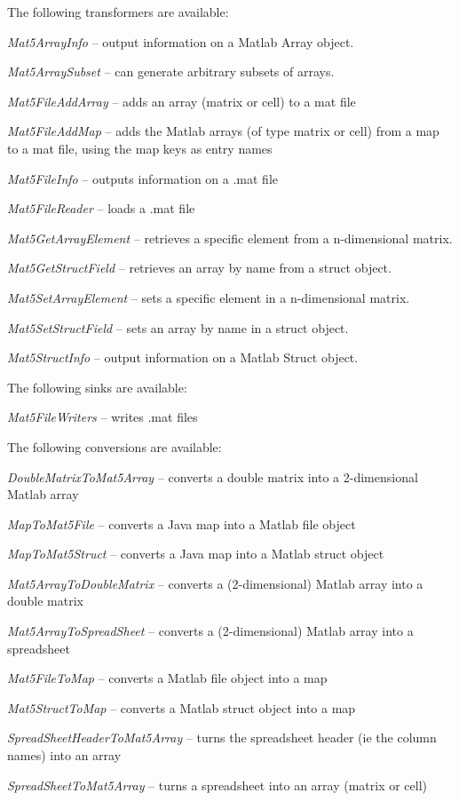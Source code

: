 \documentclass[a4paper]{book}
\begin{document}
The following transformers are available:
\begin{tight_itemize}
  \item \textit{Mat5ArrayInfo} -- output information on a Matlab Array object.
  \item \textit{Mat5ArraySubset} -- can generate arbitrary subsets of arrays.
  \item \textit{Mat5FileAddArray} -- adds an array (matrix or cell) to a mat file
  \item \textit{Mat5FileAddMap} -- adds the Matlab arrays (of type matrix or cell) from a map to a mat file, using the map keys as entry names
  \item \textit{Mat5FileInfo} -- outputs information on a .mat file
  \item \textit{Mat5FileReader} -- loads a .mat file
  \item \textit{Mat5GetArrayElement} -- retrieves a specific element from a n-dimensional matrix.
  \item \textit{Mat5GetStructField} -- retrieves an array by name from a struct object.
  \item \textit{Mat5SetArrayElement} -- sets a specific element in a n-dimensional matrix.
  \item \textit{Mat5SetStructField} -- sets an array by name in a struct object.
  \item \textit{Mat5StructInfo} -- output information on a Matlab Struct object.
\end{tight_itemize}

The following sinks are available:
\begin{tight_itemize}
  \item \textit{Mat5FileWriters} -- writes .mat files
\end{tight_itemize}

The following conversions are available:
\begin{tight_itemize}
  \item \textit{DoubleMatrixToMat5Array} -- converts a double matrix into a 2-dimensional Matlab array
  \item \textit{MapToMat5File} -- converts a Java map into a Matlab file object
  \item \textit{MapToMat5Struct} -- converts a Java map into a Matlab struct object
  \item \textit{Mat5ArrayToDoubleMatrix} -- converts a (2-dimensional) Matlab array into a double matrix
  \item \textit{Mat5ArrayToSpreadSheet} -- converts a (2-dimensional) Matlab array into a spreadsheet
  \item \textit{Mat5FileToMap} -- converts a Matlab file object into a map
  \item \textit{Mat5StructToMap} -- converts a Matlab struct object into a map
  \item \textit{SpreadSheetHeaderToMat5Array} -- turns the spreadsheet header (ie the column names) into an array
  \item \textit{SpreadSheetToMat5Array} -- turns a spreadsheet into an array (matrix or cell)
\end{tight_itemize}
\end{document}
